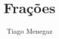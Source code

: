 \documentclass[12pt, a4paper, font, table]{article}
\author{Tiago Menegaz}
\title{Frações}
\begin{document}
	
	\renewcommand{\CancelColor}{\color{red}}










\end{document}
